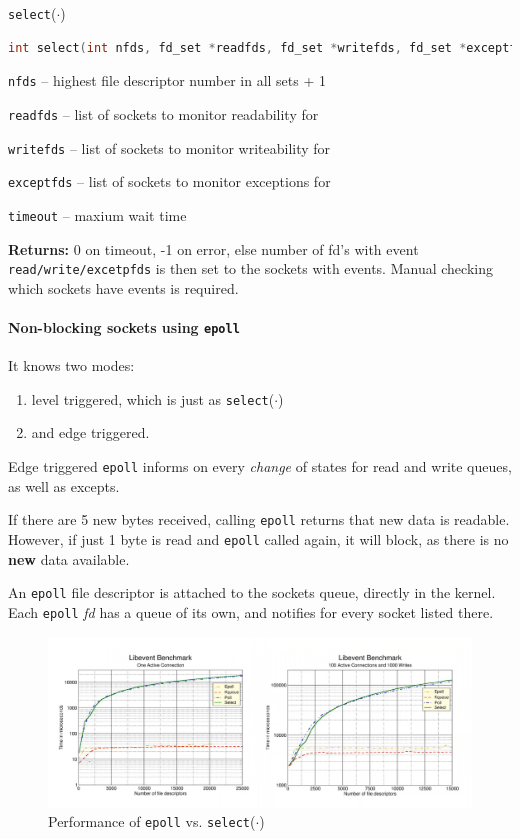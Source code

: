 \documentclass[english]{panikzettel}
\newcommand{\fkt}[1]{\texttt{#1}(\(\cdot\))}
\begin{document}
	\begin{defi}{\fkt{select}}
		\begin{lstlisting}[language=C]
			int select(int nfds, fd_set *readfds, fd_set *writefds, fd_set *exceptfds, struct timeval *timeout);
		\end{lstlisting}
		\tcblower
		\texttt{nfds} – highest file descriptor number in all sets + 1 
		
		\texttt{readfds} – list of sockets to monitor readability for 

		\texttt{writefds} – list of sockets to monitor writeability for

		\texttt{exceptfds} – list of sockets to monitor exceptions for
		
		\texttt{timeout} – maxium wait time
		
		\textbf{Returns:} 0 on timeout, -1 on error, else number of fd's with event \texttt{read/write/excetpfds} is then set to the sockets with events. Manual checking which sockets have events is required.
		\texttt{}
	\end{defi}

	\paragraph{Non-blocking sockets using \texttt{epoll}}

	It knows two modes:
	\begin{enumerate}
		\item level triggered, which is just as \fkt{select}
		\item and edge triggered.
	\end{enumerate}

	Edge triggered \texttt{epoll} informs on every \textit{change} of states for read and write queues, as well as excepts. 

	If there are 5 new bytes received, calling \texttt{epoll} returns that new data is readable. 
	However, if just 1 byte is read and \texttt{epoll} called again, it will block, as there is no \textbf{new} data available.

	An \texttt{epoll} file descriptor is attached to the sockets queue, directly in the kernel.
	Each \texttt{epoll} \textit{fd} has a queue of its own, and notifies for every socket listed there.

	\begin{figure}[H]
		\centering
		\includegraphics[width=\textwidth]{img/1-epoll-vs-select.png}
		\caption{Performance of \texttt{epoll} vs. \fkt{select}}
		\label{img-1-epoll-vs-select}
	\end{figure}
\end{document}
